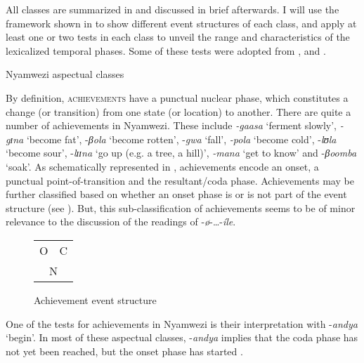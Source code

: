 \documentclass[output=paper,newtxmath,modfonts,nonflat,draftmode]{langsci/langscibook}
\begin{document}
All classes are summarized in  and discussed in brief afterwards. I will use the framework shown in  to show different event structures of each class, and apply at least one or two tests in each class to unveil the range and characteristics of the lexicalized temporal phases. Some of these tests were adopted from \citet{Kershner2002}, \citet{Crane2016} and \citet{Persohn2017b}.

\ea \label{ex:kanijo:8}
 Nyamwezi aspectual classes

\z

By definition, \textsc{achievements} have a punctual nuclear phase, which constitutes a change (or transition) from one state (or location) to another. There are quite a number of achievements in Nyamwezi. These include \textit{-gaasa} ‘ferment slowly’, \textit{-gɪna} ‘become fat’, -\textit{βola} ‘become rotten’, -\textit{gwa} ‘fall’, \textit{-pola} ‘become cold’, -\textit{lʊla} ‘become sour’, -\textit{lɪɪna} ‘go up (e.g. a tree, a hill)’, \textit{-mana} ‘get to know’ and -\textit{βoomba} ‘soak’. As schematically represented in , achievements encode an onset, a punctual point-of-transition and the resultant/coda phase. Achievements may be further classified based on whether an onset phase is or is not part of the event structure (see ). But, this sub-classification of achievements seems to be of minor relevance to the discussion of the readings of -\textit{ø}-\ldots-\textit{íle}.

\begin{figure}
\caption{Achievement event structure}
\begin{tabular}{c|c}
    \cline{1-2}
     O & C\\
    \cline{1-2}
    \multicolumn{2}{c}{N}\\
\end{tabular}
\label{fig:kanijo:5}
\end{figure} 

One of the tests for achievements in Nyamwezi is their interpretation with -\textit{andya} ‘begin’. In most of these aspectual classes, -\textit{andya} implies that the coda phase has not yet been reached, but the onset phase has started . 
\end{document}
